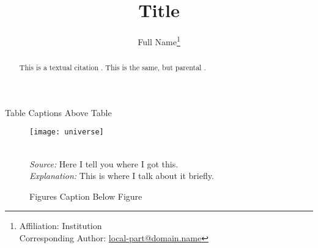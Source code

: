 \documentclass{cgu}
\title{Title}
\author{Full Name\thanks{
		Affiliation: Institution\\Corresponding Author: \href{mailto:local-part@domain.name}{local-part@domain.name}
	}
}
\begin{document}
\maketitle

\begin{abstract}
This is a textual citation \citet{Einstein1905}. This is the same, but parental \citep{Einstein1905}.
\end{abstract}

\onehalfspacing

\begin{table}[!hbpt]
    \caption{Table Captions Above Table}
    
    \label{tab:Table1}
\end{table}

\begin{figure}[!hbpt]
    {\centering
    \texttt{[image: universe]}
    }\\
    \raggedright
    \footnotesize
    \emph{\\Source:} Here I tell you where I got this.\\
    \emph{Explanation:} This is where I talk about it briefly.
    \caption{Figures Caption Below Figure}
    \label{fig:Figure1}
\end{figure}

\singlespacing

\printbibliography
\end{document}
